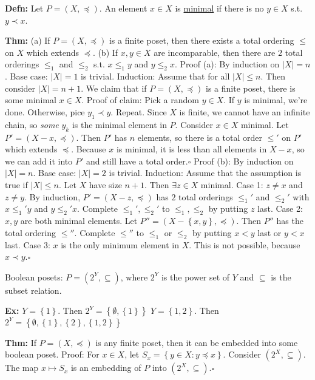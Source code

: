 \documentclass[10pt,letterpaper]{article}
\newcommand{\n}{\hfill\break}
\newcommand{\defn}[1]{\par\noindent\settowidth{\hangindent}{\textbf{Defn: }}\textbf{Defn: }#1\n}
\newcommand{\thm}[1]{\par\noindent\settowidth{\hangindent}{\textbf{Thm: }}\textbf{Thm: }#1\n}
\newcommand{\ex}[1]{\par\noindent\settowidth{\hangindent}{\textbf{Ex: }}\textbf{Ex: }#1\n}
\newcommand{\proven}{\;$\square$\n}
\newcommand{\card}[1]{\left|#1\right|}
\newcommand{\set}[1]{\left\{#1\right\}}
\newcommand{\st}{s.t.}
\begin{document}
\defn{Let $P=(X,\preceq)$. An element $x\in{}X$ is \underline{minimal} if there is no $y\in{}X$ \st{} $y\prec{}x$.}

\thm{(a) If $P=(X,\preceq)$ is a finite poset, then there exists a total ordering $\le$ on $X$ which extends $\preceq$.\n
\n
(b) If $x,y\in{}X$ are incomparable, then there are $2$ total orderings $\le_{1}$ and $\le_{2}$ \st{} $x\le_{1}y$ and $y\le_{2}x$.\n
\n
Proof (a): By induction on $\card{X}=n$.\n
Base case: $\card{X}=1$ is trivial.\n
\n
Induction: Assume that for all $\card{X}\le{}n$. Then consider $\card{X}=n+1$. We claim that if $P=(X,\preceq)$ is a finite poset, there is some minimal $x\in{}X$.\n
\n
Proof of claim: Pick a random $y\in{}X$. If $y$ is minimal, we're done. Otherwise, pice $y_{1}\prec{}y$. Repeat. Since $X$ is finite, we cannot have an infinite chain, so \textit{some} $y_{k}$ is the minimal element in $P$.\n
\n
Consider $x\in{}X$ minimal. Let $P'=(X-x,\preceq)$. Then $P'$ has $n$ elements, so there is a total order $\le'$ on $P'$ which extends $\preceq$. Because $x$ is minimal, it is less than all elements in $X-x$, so we can add it into $P'$ and still have a total order.\proven
\n
Proof (b): By induction on $\card{X}=n$.\n
Base case: $\card{X}=2$ is trivial.\n
\n
Induction: Assume that the assumption is true if $\card{X}\le{}n$. Let $X$ have size $n+1$. Then $\exists{}z\in{}X$ minimal.\n
Case 1: $z\ne{}x$ and $z\ne{}y$. By induction, $P'=(X-z,\preceq)$ has $2$ total orderings $\le_{1}'$ and $\le_{2}'$ with $x\le_{1}'y$ and $y\le_{2}'x$. Complete $\le_{1}',\le_{2}'$ to $\le_{1},\le_{2}$ by putting $z$ last.\n
Case 2: $x,y$ are both minimal elements. Let $P''=(X-\set{x,y},\preceq)$. Then $P''$ has the total ordering $\le''$. Complete $\le''$ to $\le_{1}$ or $\le_{2}$ by putting $x<y$ last or $y<x$ last.\n
Case 3: $x$ is the only minimum element in $X$. This is not possible, because $x\prec{}y$.\proven}

\par\noindent Boolean posets: $P=(2^{Y},\subseteq)$, where $2^{Y}$ is the power set of $Y$ and $\subseteq$ is the subset relation.\n

\ex{$Y=\set{1}$. Then $2^{Y}=\set{\emptyset,\set{1}}$\n
$Y=\set{1,2}$. Then $2^{Y}=\set{\emptyset,\set{1},\set{2},\set{1,2}}$}

\thm{If $P=(X,\preceq)$ is any finite poset, then it can be embedded into some boolean poset.\n
Proof: For $x\in{}X$, let $S_{x}=\set{y\in{}X:y\preceq{}x}$. Consider $(2^{X},\subseteq)$. The map $x\mapsto{}S_{x}$ is an embedding of $P$ into $(2^{X},\subseteq)$.\proven}
\end{document}
